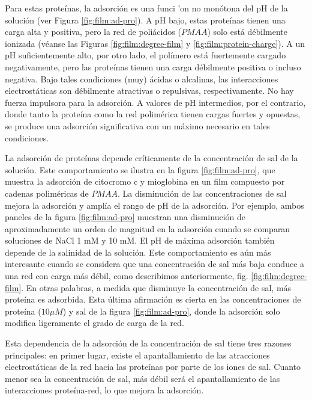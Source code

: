Para estas prote\'inas, la adsorci\'on es una funci
'on no mon\'otona del pH de la soluci\'on (ver Figura \ref{fig:film:ad-pro}). A pH bajo, estas prote\'inas tienen una carga alta y positiva, pero la red de poli\'acidos ($PMAA$) solo est\'a d\'ebilmente ionizada (v\'eanse las Figuras \ref{fig:film:degree-film} y \ref{fig:film:protein-charge}). A un pH suficientemente alto, por otro lado, el pol\'imero est\'a fuertemente cargado negativamente, pero las prote\'inas tienen una carga d\'ebilmente positiva o incluso negativa. Bajo tales condiciones (muy) \'acidas o alcalinas, las interacciones electrost\'aticas son d\'ebilmente atractivas o repulsivas, respectivamente. No hay fuerza impulsora para la adsorci\'on. A valores de pH intermedios, por el contrario, donde tanto la prote\'ina como la red polim\'erica tienen cargas fuertes y opuestas, se produce una adsorci\'on significativa con un m\'aximo necesario en tales condiciones.

La adsorci\'on de prote\'inas depende cr\'iticamente de la concentraci\'on de sal de la soluci\'on. Este comportamiento se ilustra en la figura \ref{fig:film:ad-pro}, que muestra la adsorci\'on de citocromo c y mioglobina en un film compuesto por cadenas polim\'ericas de $PMAA$. La disminuci\'on de las concentraciones de sal mejora la adsorci\'on y ampl\'ia el rango de pH de la adsorci\'on.
Por ejemplo, ambos paneles de la figura \ref{fig:film:ad-pro} muestran una disminuci\'on de aproximadamente un orden de magnitud en la adsorci\'on cuando se comparan soluciones de NaCl 1 mM y 10 mM.
El pH de m\'axima adsorci\'on tambi\'en depende de la salinidad de la soluci\'on. Este comportamiento es a\'un m\'as interesante cuando se considera que una concentraci\'on de sal m\'as baja conduce a una red con carga m\'as d\'ebil, como describimos anteriormente, fig. \ref{fig:film:degree-film}.
En otras palabras, a medida que disminuye la concentraci\'on de sal, m\'as prote\'ina es adsorbida. Esta \'ultima afirmaci\'on es cierta en las concentraciones de prote\'ina ($10 \mu M$) y sal de la figura \ref{fig:film:ad-pro}, donde la adsorci\'on solo modifica ligeramente el grado de carga de la red.

Esta dependencia de la adsorci\'on de la concentraci\'on de sal tiene tres razones principales: en primer lugar, existe el apantallamiento de las atracciones electrost\'aticas de la red hacia las prote\'inas por parte de los iones de sal.
Cuanto menor sea la concentraci\'on de sal, m\'as d\'ebil ser\'a el apantallamiento de las interacciones prote\'ina-red, lo que mejora la adsorci\'on.




